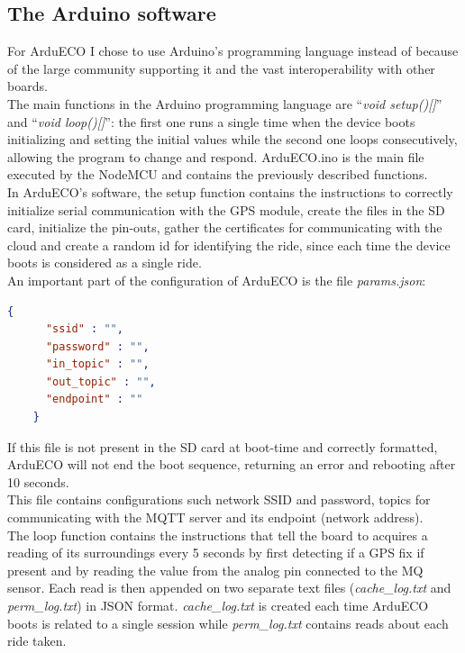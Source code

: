 \documentclass[conference]{IEEEtran}
\begin{document}
	\subsection{The Arduino software}
	
		For ArduECO I chose to use Arduino's programming language instead of \cite{micropyhton} because of the large community supporting it and the vast interoperability with other boards.\\
		The main functions in the Arduino programming language are ``\textit{void setup()[]}'' and ``\textit{void loop()[]}'': the first one runs a single time when the device boots initializing and setting the initial values while the second one loops consecutively, allowing the program to change and respond.
		ArduECO.ino is the main file executed by the NodeMCU and contains the previously described functions.\\
		In ArduECO's software, the setup function contains the instructions to correctly initialize serial communication with the GPS module, create the files in the SD card, initialize the pin-outs, gather the certificates for communicating with the cloud and create a random id for identifying the ride, since each time the device boots is considered as a single ride.\\
		An important part of the configuration of ArduECO is the file \textit{params.json}:
		\begin{lstlisting}[language=json,firstnumber=1]
    {
	  "ssid" : "",
	  "password" : "",
	  "in_topic" : "",
	  "out_topic" : "",
	  "endpoint" : ""
    }
		\end{lstlisting}
		If this file is not present in the SD card at boot-time and correctly formatted, ArduECO will not end the boot sequence, returning an error and rebooting after 10 seconds.\\
		This file contains configurations such network SSID and password, topics for communicating with the MQTT server and its endpoint (network address).\\
		The loop function contains the instructions that tell the board to acquires a reading of its surroundings every 5 seconds by first detecting if a GPS fix if present and by reading the value from the analog pin connected to the MQ sensor.
		Each read is then appended on two separate text files (\textit{cache\_log.txt} and \textit{perm\_log.txt}) in JSON format. 
		\textit{cache\_log.txt} is created each time ArduECO boots is related to a single session while \textit{perm\_log.txt} contains reads about each ride taken.\\
\end{document}
